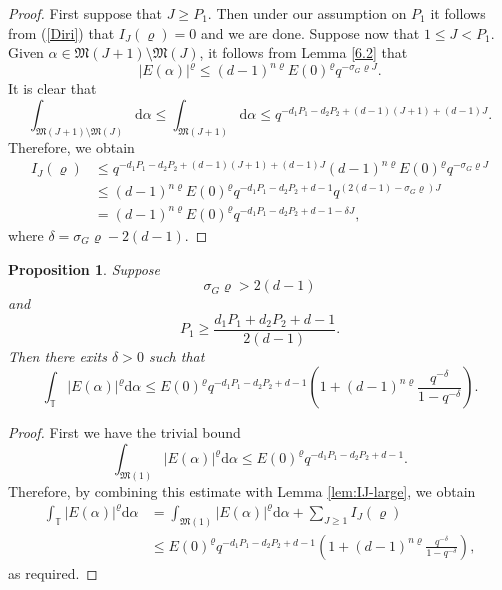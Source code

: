 \documentclass[12pt, reqno]{amsart}
\numberwithin{equation}{section}
\renewcommand{\d}{\mathrm{d}}
\newcommand{\0}{\mathbf{0}}
\newcommand{\TT}{\mathbb{T}}
\renewcommand{\leq}{\leqslant}
\renewcommand{\geq}{\geqslant}
\renewcommand{\=}{\equiv}
\newcommand{\1}{\mathbf{1}}
\newtheorem{proposition}[theorem]{Proposition}
\theoremstyle{definition}
\begin{document}
\begin{proof}
First suppose that $J\geq P_1$. Then under our assumption on $P_1$ it follows 
from (\ref{Diri}) that $I_J(\varrho) = 0$ and we are done. Suppose now that  $ 1 \leq J < P_1$.
Given $\alpha \in \mathfrak{M}(J+1) \setminus  \mathfrak{M}(J)$, it follows from Lemma \ref{6.2} that
$$
|E(\alpha)|^{\varrho} \leq  (d-1)^{ n \varrho}  E(0)^{\varrho} q^{ - \sigma_G  \varrho J}.
$$
It is clear that
$$
 \int_{ \mathfrak{M}(J+1) \setminus  \mathfrak{M}(J)}    \d \alpha \leq
  \int_{ \mathfrak{M}(J+1)}   \d \alpha \leq q^{ - d_1 P_1 - d_2 P_2 + (d-1) (J+1) + (d-1) J}.
$$
Therefore, we obtain
\begin{align*}
I_J  (\varrho)
&\leq
q^{ - d_1 P_1 - d_2 P_2 + (d-1) (J+1)   + (d-1) J}
(d-1)^{ n \varrho}  E(0)^{\varrho} q^{ - \sigma_G  \varrho J}
\\
&\leq
(d-1)^{ n \varrho}
E(0)^{\varrho} q^{   - d_1 P_1 - d_2 P_2 + d - 1}
q^{  ( 2  (d-1)  - \sigma_G \varrho) J}
\\
&=
(d-1)^{ n \varrho} E(0)^{\varrho} q^{ - d_1 P_1 - d_2 P_2 + d-1 - \delta J},
\end{align*}
where $\delta = \sigma_G \varrho - 2 (d-1)$.
\end{proof}


\begin{proposition}
\label{MVT}
Suppose
$$
\sigma_G  \varrho > 2 (d-1)
$$
and
$$
P_1 \geq \frac{ d_1 P_1 + d_2 P_2  + d - 1 }{ 2( d -  1)}.
$$
Then there exits $\delta > 0$ such that
$$
\int_{\TT} |E(\alpha)|^\varrho   \d \alpha \leq  E(0)^{\varrho} q^{ - d_1 P_1 - d_2 P_2 + d - 1 }
\left( 1 + (d-1)^{ n \varrho}  \frac{q^{- \delta} }{1 - q^{- \delta}} \right).
$$
\end{proposition}
\begin{proof}
First we have the trivial bound
$$
\int_{\mathfrak{M}(1)} |E(\alpha)|^\varrho   \d \alpha \leq   E(0)^{\varrho} q^{ - d_1 P_1 - d_2 P_2 + d - 1 }.
$$
Therefore, by combining this estimate with Lemma \ref{lem:IJ-large}, we obtain
\begin{align*}
\int_{\TT} |E(\alpha)|^\varrho   \d \alpha &= \int_{\mathfrak{M}(1)} |E(\alpha)|^\varrho   \d \alpha  + \sum_{J \geq 1} I_J  (\varrho)
\\
&\leq
 E(0)^{\varrho}  q^{ - d_1 P_1 - d_2 P_2 + d - 1 } \left( 1 + (d-1)^{ n \varrho}  \frac{q^{- \delta} }{1 - q^{- \delta}} \right),
\end{align*}
as required.
\end{proof}
\end{document}
